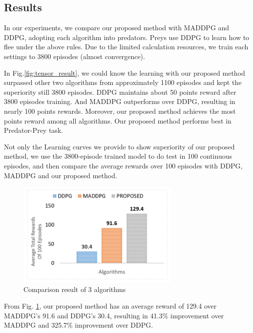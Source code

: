 \documentclass[11pt,twocolumn]{jarticle} %
\begin{document}
\subsection{Results}


In our experiments, we compare our proposed method with MADDPG and DDPG, adopting each algorithm into predators. Preys use DDPG to learn how to flee under the above rules. Due to the limited calculation resources, we train each settings to 3800 episodes (almost convergence).  


In Fig.\ref{fig:tensor_result}, we could know the learning with our proposed method surpassed other two algorithms from approximately 1100 episodes and kept the superiority still 3800 episodes. DDPG maintains about 50 points reward after 3800 episodes training. And MADDPG outperforms over DDPG, resulting in nearly 100 points rewards. Moreover, our proposed method achieves the most points reward among all algorithms. Our proposed method performs best in Predator-Prey task. \par



Not only the Learning curves we provide to show superiority of our proposed method, we use the 3800-episode trained model to do test in 100 continuous episodes, and then compare the average rewards over 100 episodes with DDPG, MADDPG and our proposed method.

\begin{figure}[h]
 \begin{center}
  \includegraphics[width=8cm]{imgs/result_table.PNG}
  \caption{ Comparison result of 3 algorithms }
  \label{fig:result}
 \end{center}
\end{figure}

From Fig. \ref{fig:result}, our proposed method has an average reward of 129.4 over MADDPG's 91.6 and DDPG's 30.4, resulting in 41.3\% improvement over MADDPG and 325.7\% improvement over DDPG.
\end{document}
